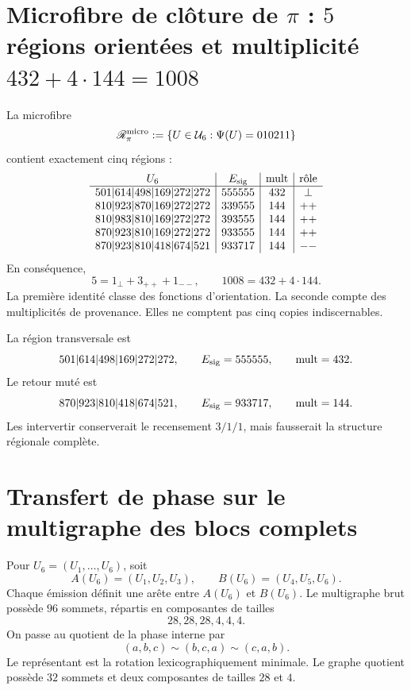 \section{Microfibre de clôture de \(\pi\) : \(5\) régions orientées et multiplicité \(432+4\cdot144=1008\)}

La microfibre
\[
 \mathscr R_\pi^{\rm micro}
 :=\{U\in\mathcal U_6:\Psi(U)=010211\}
\]
contient exactement cinq régions :
\[
\begin{array}{c|c|c|c}
U_6&E_{\rm sig}&\operatorname{mult}&\text{rôle}\\ \hline
501|614|498|169|272|272&555555&432&\perp\\
810|923|870|169|272|272&339555&144&++\\
810|983|810|169|272|272&393555&144&++\\
870|923|810|169|272|272&933555&144&++\\
870|923|810|418|674|521&933717&144&--
\end{array}
\]
En conséquence,
\begin{equation}
 \boxed{
 5=1_\perp+3_{++}+1_{--},
 \qquad
 1008=432+4\cdot144.}
 \label{gfp:b:eq:descomposiciones-cinco-regiones-pi}
\end{equation}
La première identité classe des fonctions d’orientation. La seconde compte
des multiplicités de provenance. Elles ne comptent pas cinq copies indiscernables.

La région transversale est
\[
 501|614|498|169|272|272,
 \qquad E_{\rm sig}=555555,
 \qquad\operatorname{mult}=432.
\]
Le retour muté est
\[
 870|923|810|418|674|521,
 \qquad E_{\rm sig}=933717,
 \qquad\operatorname{mult}=144.
\]
Les intervertir conserverait le recensement \(3/1/1\), mais fausserait la structure
régionale complète.

\section{Transfert de phase sur le multigraphe des blocs complets}

Pour \(U_6=(U_1,\ldots,U_6)\), soit
\[
 A(U_6)=(U_1,U_2,U_3),
 \qquad
 B(U_6)=(U_4,U_5,U_6).
\]
Chaque émission définit une arête entre \(A(U_6)\) et \(B(U_6)\). Le multigraphe
brut possède \(96\) sommets, répartis en composantes de tailles
\[
 28,28,28,4,4,4.
\]
On passe au quotient de la phase interne par
\[
 (a,b,c)\sim(b,c,a)\sim(c,a,b).
\]
Le représentant est la rotation lexicographiquement minimale. Le graphe
quotient possède \(32\) sommets et deux composantes de tailles \(28\) et \(4\).

